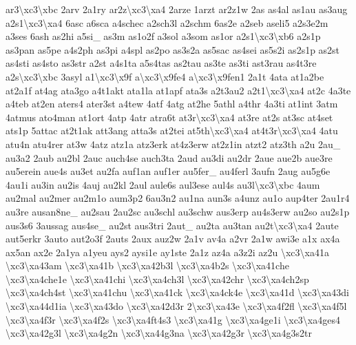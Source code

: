 {ar3\textbackslash{}xc3\textbackslash{}xbc 2arv 2a1ry ar2z\textbackslash{}xc3\textbackslash{}xa4 2arze 1arzt ar2z1w 2as as4al as1au as3aug a2s1\textbackslash{}xc3\textbackslash{}xa4 6asc a6sca a4schec a2sch3l a2schm 6as2e a2seb aseli5 a2s3e2m a3ses 6ash as2hi a5si\-\_\- as3m as1o2f a3sol a3som as1or a2s1\textbackslash{}xc3\textbackslash{}xb6 a2s1p as3pan as5pe a4s2ph as3pi a4spl as2po as3s2a as5sac as4sei as5s2i as2s1p as2st as4sti as4sto as3str a2st a4s1ta a5s4tas as2tau as3te as3ti ast3rau as4t3re a2s\textbackslash{}xc3\textbackslash{}xbc 3asyl a1\textbackslash{}xc3\textbackslash{}x9f a\textbackslash{}xc3\textbackslash{}x9fe4 a\textbackslash{}xc3\textbackslash{}x9fen1 2a1t 4ata at1a2be at2a1f at4ag ata3go a4t1akt ata1la at1apf ata3s a2t3au2 a2t1\textbackslash{}xc3\textbackslash{}xa4 at2c 4a3te a4teb at2en aters4 ater3st a4tew 4atf 4atg at2he 5athl a4thr 4a3ti at1int 3atm 4atmus ato4man at1ort 4atp 4atr atra6t at3r\textbackslash{}xc3\textbackslash{}xa4 at3re at2s at3sc at4set ats1p 5attac at2t1ak att3ang atta3s at2tei at5th\textbackslash{}xc3\textbackslash{}xa4 at4t3r\textbackslash{}xc3\textbackslash{}xa4 4atu atu4n atu4rer at3w 4atz atz1a atz3erk at4z3erw at2z1in atzt2 atz3th a2u 2au\-\_\- au3a2 2aub au2bl 2auc auch4se auch3ta 2aud au3di au2dr 2aue aue2b aue3re au5erein aue4s au3et au2fa auf1an auf1er au5fer\-\_\- au4ferl 3aufn 2aug au5g6e 4au1i au3in au2is 4auj au2kl 2aul aule6s aul3ese aul4s au3l\textbackslash{}xc3\textbackslash{}xbc 4aum au2mal au2mer au2m1o aum3p2 6au3n2 au1na aun3s a4unz au1o aup4ter 2au1r4 au3re ausan8ne\-\_\- au2sau 2au2sc au3schl au3schw aus3erp au4s3erw au2so au2s1p aus3s6 3aussag aus4se\-\_\- au2st aus3tri 2aut\-\_\- au2ta au3tan au2t\textbackslash{}xc3\textbackslash{}xa4 2aute aut5erkr 3auto aut2o3f 2auts 2aux auz2w 2a1v av4a a2vr 2a1w awi3e a1x ax4a ax5an ax2e 2a1ya a1yeu ays2 aysi1e ay1ste 2a1z az4a a3z2i az2u \textbackslash{}xc3\textbackslash{}xa41a \textbackslash{}xc3\textbackslash{}xa43am \textbackslash{}xc3\textbackslash{}xa41b \textbackslash{}xc3\textbackslash{}xa42b3l \textbackslash{}xc3\textbackslash{}xa4b2s \textbackslash{}xc3\textbackslash{}xa41che \textbackslash{}xc3\textbackslash{}xa4che1e \textbackslash{}xc3\textbackslash{}xa41chi \textbackslash{}xc3\textbackslash{}xa4ch3l \textbackslash{}xc3\textbackslash{}xa42chr \textbackslash{}xc3\textbackslash{}xa4ch2sp \textbackslash{}xc3\textbackslash{}xa4ch4st \textbackslash{}xc3\textbackslash{}xa41chu \textbackslash{}xc3\textbackslash{}xa41ck \textbackslash{}xc3\textbackslash{}xa4ck4e \textbackslash{}xc3\textbackslash{}xa41d \textbackslash{}xc3\textbackslash{}xa43di \textbackslash{}xc3\textbackslash{}xa44d1ia \textbackslash{}xc3\textbackslash{}xa43do \textbackslash{}xc3\textbackslash{}xa42d3r 2\textbackslash{}xc3\textbackslash{}xa43e \textbackslash{}xc3\textbackslash{}xa4f2fl \textbackslash{}xc3\textbackslash{}xa4f5l \textbackslash{}xc3\textbackslash{}xa4f3r \textbackslash{}xc3\textbackslash{}xa4f2s \textbackslash{}xc3\textbackslash{}xa4ft4s3 \textbackslash{}xc3\textbackslash{}xa41g \textbackslash{}xc3\textbackslash{}xa4ge1i \textbackslash{}xc3\textbackslash{}xa4ges4 \textbackslash{}xc3\textbackslash{}xa42g3l \textbackslash{}xc3\textbackslash{}xa4g2n \textbackslash{}xc3\textbackslash{}xa44g3na \textbackslash{}xc3\textbackslash{}xa42g3r \textbackslash{}xc3\textbackslash{}xa4g3s2tr }
